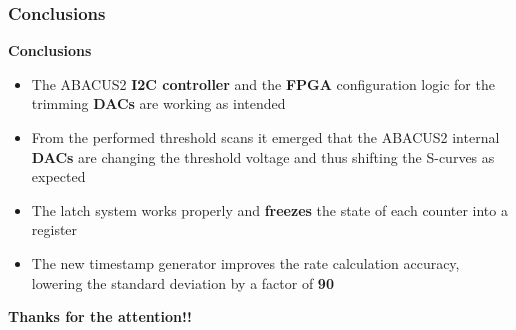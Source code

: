 \documentclass[aspectratio=169]{beamer}
\begin{document}
	\begin{frame}
	\frametitle{Conclusions}
	\begin{center}
		{\color{blue}\textbf{Conclusions}}
	\end{center}
		\begin{itemize}
			\item The ABACUS2 \textbf{I2C controller} and the \textbf{FPGA} configuration
			logic for the trimming \textbf{DACs} are working as intended
			\item From the performed threshold scans it emerged that the ABACUS2
			internal \textbf{DACs} are changing the threshold voltage and thus
			shifting the S-curves as expected
			\item The latch system works properly and \textbf{freezes} the state
			of each counter into a register
			\item The new timestamp generator improves the rate
			calculation accuracy, lowering the standard deviation by a factor of \textbf{90}
		\end{itemize}
			\vspace{0.8 cm}
		\begin{center}
			\textbf{Thanks for the attention!!}
		\end{center}	
	\end{frame}
\end{document}
